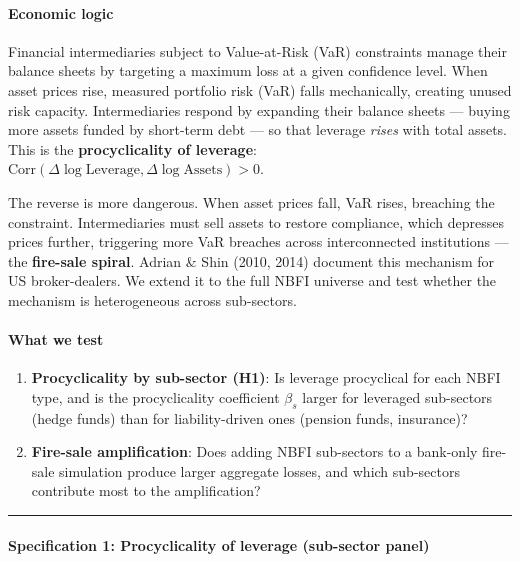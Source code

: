 \documentclass[11pt,a4paper]{article}
\begin{document}
\paragraph{Economic logic}

Financial intermediaries subject to Value-at-Risk (VaR) constraints manage their balance sheets by targeting a maximum loss at a given confidence level. When asset prices rise, measured portfolio risk (VaR) falls mechanically, creating unused risk capacity. Intermediaries respond by expanding their balance sheets --- buying more assets funded by short-term debt --- so that leverage \textit{rises} with total assets. This is the \textbf{procyclicality of leverage}: $\text{Corr}(\Delta \log \text{Leverage}, \Delta \log \text{Assets}) > 0$.

The reverse is more dangerous. When asset prices fall, VaR rises, breaching the constraint. Intermediaries must sell assets to restore compliance, which depresses prices further, triggering more VaR breaches across interconnected institutions --- the \textbf{fire-sale spiral}. Adrian \& Shin (2010, 2014) document this mechanism for US broker-dealers. We extend it to the full NBFI universe and test whether the mechanism is heterogeneous across sub-sectors.


\paragraph{What we test}

\begin{enumerate}
\item \textbf{Procyclicality by sub-sector (H1)}: Is leverage procyclical for each NBFI type, and is the procyclicality coefficient $\beta_s$ larger for leveraged sub-sectors (hedge funds) than for liability-driven ones (pension funds, insurance)?

\item \textbf{Fire-sale amplification}: Does adding NBFI sub-sectors to a bank-only fire-sale simulation produce larger aggregate losses, and which sub-sectors contribute most to the amplification?

\end{enumerate}

\bigskip\noindent\rule{\textwidth}{0.4pt}\bigskip


\paragraph{Specification 1: Procyclicality of leverage (sub-sector panel)}
\end{document}
